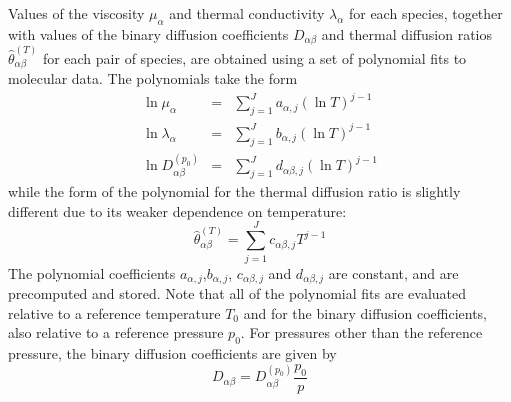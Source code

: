 \documentclass[dvips]{article}
\begin{document}
Values of the viscosity $\mu_{\alpha}$ and thermal conductivity
$\lambda_{\alpha}$ for each species, together with values of the binary
diffusion coefficients $D_{\alpha\beta}$ and thermal diffusion
ratios $\hat{\theta}_{\alpha\beta}^{(T)}$ for each pair of species, are obtained
using a set of polynomial fits to molecular data.  The polynomials take the
form \cite{Transport}
\begin{eqnarray}
\ln{\mu_{\alpha}} & = & \sum_{j=1}^{J}a_{\alpha,j}\left(\ln{T}\right)^{j-1}
\nonumber \\
\ln{\lambda_{\alpha}} & = & \sum_{j=1}^{J}b_{\alpha,j}\left(\ln{T}\right)^{j-1}
\nonumber \\
\ln{D_{\alpha\beta}^{(p_{0})}} & = &
\sum_{j=1}^{J}d_{\alpha\beta,j}\left(\ln{T}\right)^{j-1}
\label{LOGPOLY}
\end{eqnarray}
while the form of the polynomial for the thermal diffusion ratio is slightly
different due to its weaker dependence on temperature: 
\begin{equation}
\hat{\theta}_{\alpha\beta}^{(T)} = \sum_{j=1}^{J}c_{\alpha\beta,j}T^{j-1}
\label{TDRPOLY}
\end{equation}
The polynomial coefficients $a_{\alpha,j}$,$b_{\alpha,j}$,
$c_{\alpha\beta,j}$ and $d_{\alpha\beta,j}$ are constant, and are
precomputed and stored.
Note that all of the polynomial fits are evaluated relative to a reference
temperature $T_{0}$ and for the binary diffusion coefficients, also relative
to a reference pressure $p_{0}$.  For pressures other than the reference
pressure, the binary diffusion coefficients are given by
\begin{equation}
D_{\alpha\beta} = D_{\alpha\beta}^{(p_{0})}\frac{p_{0}}{p}
\end{equation}
\end{document}
